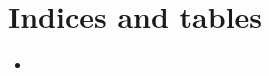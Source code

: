 \documentclass[letterpaper,10pt,english]{sphinxmanual}
\begin{document}
\chapter{Indices and tables}
\label{\detokenize{index:indices-and-tables}}\begin{itemize}
\item {} 

\end{itemize}


\renewcommand{\indexname}{Python Module Index}
\begin{sphinxtheindex}
\let\bigletter\sphinxstyleindexlettergroup
\bigletter{h}
\item\relax{}
\end{sphinxtheindex}

\renewcommand{\indexname}{Index}
\printindex
\end{document}
